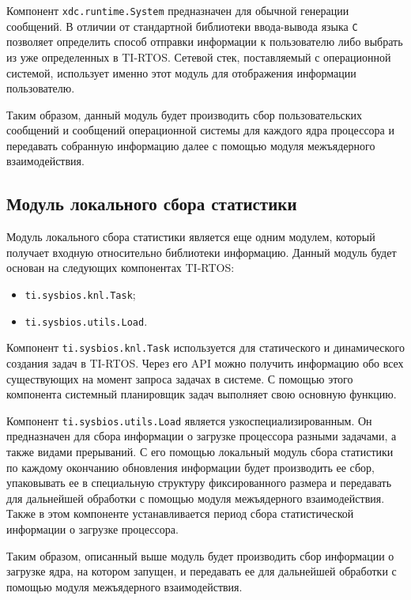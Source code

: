 
Компонент \texttt{xdc.runtime.System} предназначен для обычной генерации сообщений.
В отличии от стандартной библиотеки ввода-вывода языка \texttt{C} позволяет
определить способ отправки информации к пользователю либо выбрать из уже
определенных в TI-RTOS. Сетевой стек, поставляемый с операционной системой,
использует именно этот модуль для отображения информации пользователю.

Таким образом, данный модуль будет производить сбор пользовательских сообщений
и сообщений операционной системы для каждого ядра процессора и передавать
собранную информацию далее с помощью модуля межъядерного взаимодействия.

\subsection{Модуль локального сбора статистики}

Модуль локального сбора статистики является еще одним модулем, который получает
входную относительно библиотеки информацию. Данный модуль будет основан на
следующих компонентах TI-RTOS:
\begin{itemize}
    \item \texttt{ti.sysbios.knl.Task};
    \item \texttt{ti.sysbios.utils.Load}.
\end{itemize}

Компонент \texttt{ti.sysbios.knl.Task} используется для статического и
динамического создания задач в TI-RTOS. Через его API можно получить информацию
обо всех существующих на момент запроса задачах в системе. С помощью этого
компонента системный планировщик задач выполняет свою основную функцию.

Компонент \texttt{ti.sysbios.utils.Load} является узкоспециализированным.
Он предназначен для сбора информации о загрузке процессора разными задачами,
а также видами прерываний. С его помощью локальный модуль сбора статистики
по каждому окончанию обновления информации будет производить ее сбор,
упаковывать ее в специальную структуру фиксированного размера и передавать
для дальнейшей обработки с помощью модуля межъядерного взаимодействия.
Также в этом компоненте устанавливается период сбора статистической информации
о загрузке процессора.

Таким образом, описанный выше модуль будет производить сбор информации
о загрузке ядра, на котором запущен, и передавать ее для дальнейшей обработки
с помощью модуля межъядерного взаимодействия.

